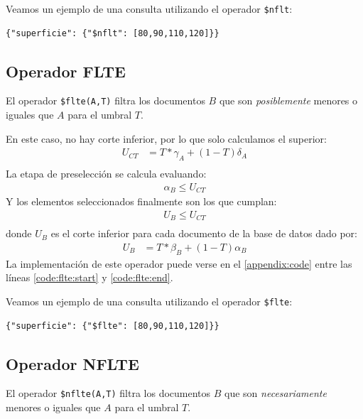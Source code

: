 \begin{example}
Veamos un ejemplo de una consulta utilizando el operador \texttt{\$nflt}:
%
\begin{verbatim}
{"superficie": {"$nflt": [80,90,110,120]}}
\end{verbatim}

\end{example}

\subsection{Operador FLTE}

El operador \texttt{\$flte(A,T)} filtra los documentos $B$ que son \textit{posiblemente} menores o iguales que $A$ para el umbral $T$.

En este caso, no hay corte inferior, por lo que solo calculamos el superior:
%
\begin{align*}
    U_{CT} &= T * \gamma_A + (1-T)\delta_A \\
\end{align*}
%
La etapa de preselección se calcula evaluando:
%
\begin{align*}
    \alpha_B \leq U_{CT}
\end{align*}
%
Y los elementos seleccionados finalmente son los que cumplan:
%
\begin{align*}
    U_B \leq U_{CT} \\
\end{align*}
%
donde $U_B$ es el corte inferior para cada documento de la base de datos dado por:
%
\begin{align*}
    U_B &= T * \beta_B + (1-T)\alpha_B
\end{align*}
%
La implementación de este operador puede verse en el \autoref{appendix:code} entre las líneas \ref{code:flte:start} y \ref{code:flte:end}.

\begin{example}
Veamos un ejemplo de una consulta utilizando el operador \texttt{\$flte}:
%
\begin{verbatim}
{"superficie": {"$flte": [80,90,110,120]}}
\end{verbatim}

\end{example}

\subsection{Operador NFLTE}

El operador \texttt{\$nflte(A,T)} filtra los documentos $B$ que son \textit{necesariamente} menores o iguales que $A$ para el umbral $T$.

